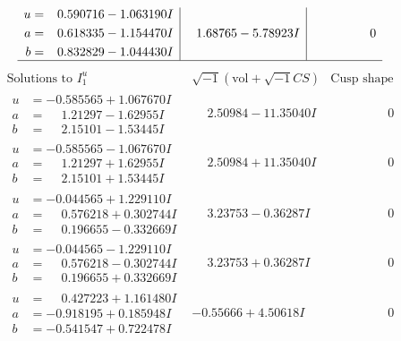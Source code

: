 \documentclass[1p]{elsarticle_modified}
\theoremstyle{definition}
\newcommand{\I}{\sqrt{-1}}
\begin{document}
$$\begin{array}{c|c|c}
\begin{aligned}
u &= \phantom{-}0.590716 - 1.063190 I \\
a &= \phantom{-}0.618335 - 1.154470 I \\
b &= \phantom{-}0.832829 - 1.044430 I\end{aligned}
 & \phantom{-}1.68765 - 5.78923 I & \phantom{-0.000000 } 0\\
 \hline 
 \end{array}$$\newpage$$\begin{array}{c|c|c}  
\text{Solutions to }I^u_{1}& \I (\text{vol} + \sqrt{-1}CS) & \text{Cusp shape}\\
 \hline 
\begin{aligned}
u &= -0.585565 + 1.067670 I \\
a &= \phantom{-}1.21297 - 1.62955 I \\
b &= \phantom{-}2.15101 - 1.53445 I\end{aligned}
 & \phantom{-}2.50984 - 11.35040 I & \phantom{-0.000000 } 0 \\ \hline\begin{aligned}
u &= -0.585565 - 1.067670 I \\
a &= \phantom{-}1.21297 + 1.62955 I \\
b &= \phantom{-}2.15101 + 1.53445 I\end{aligned}
 & \phantom{-}2.50984 + 11.35040 I & \phantom{-0.000000 } 0 \\ \hline\begin{aligned}
u &= -0.044565 + 1.229110 I \\
a &= \phantom{-}0.576218 + 0.302744 I \\
b &= \phantom{-}0.196655 - 0.332669 I\end{aligned}
 & \phantom{-}3.23753 - 0.36287 I & \phantom{-0.000000 } 0 \\ \hline\begin{aligned}
u &= -0.044565 - 1.229110 I \\
a &= \phantom{-}0.576218 - 0.302744 I \\
b &= \phantom{-}0.196655 + 0.332669 I\end{aligned}
 & \phantom{-}3.23753 + 0.36287 I & \phantom{-0.000000 } 0 \\ \hline\begin{aligned}
u &= \phantom{-}0.427223 + 1.161480 I \\
a &= -0.918195 + 0.185948 I \\
b &= -0.541547 + 0.722478 I\end{aligned}
 & -0.55666 + 4.50618 I & \phantom{-0.000000 } 0 \\ \hline\begin{aligned}

\end{aligned}
\end{array}$$
\end{document}
